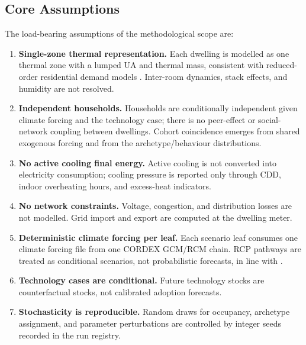 \subsection{Core Assumptions}
\label{sec:core_assumptions}
 
The load-bearing assumptions of the methodological scope are:
 
\begin{enumerate}[label=A\arabic*., leftmargin=2.2em, itemsep=2pt, topsep=2pt]
  \item \textbf{Single-zone thermal representation.} Each dwelling is modelled as one thermal zone with a lumped UA and thermal mass, consistent with reduced-order residential demand models \cite{Reynders2014_ModelComplexity,Bacher2011}. Inter-room dynamics, stack effects, and humidity are not resolved.
 
  \item \textbf{Independent households.} Households are conditionally
  independent given climate forcing and the technology case; there is no peer-effect or social-network coupling between dwellings. Cohort coincidence emerges from shared exogenous forcing and from the archetype/behaviour distributions.
 
  \item \textbf{No active cooling final energy.} Active cooling is not converted into electricity consumption; cooling pressure is reported only through CDD, indoor overheating hours, and excess-heat indicators.
 
  \item \textbf{No network constraints.} Voltage, congestion, and distribution losses are not modelled. Grid import and export are computed at the dwelling meter.
 
  \item \textbf{Deterministic climate forcing per leaf.} Each scenario leaf consumes one climate forcing file from one CORDEX GCM/RCM chain. RCP pathways are treated as conditional scenarios, not probabilistic forecasts, in line with \textcite{vanVuuren2011,IPCC2014}.
 
  \item \textbf{Technology cases are conditional.} Future technology stocks are counterfactual stocks, not calibrated adoption forecasts.
 
  \item \textbf{Stochasticity is reproducible.} Random draws for occupancy, archetype assignment, and parameter perturbations are controlled by integer seeds recorded in the run registry.
\end{enumerate}
 
